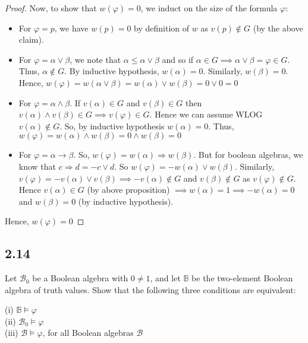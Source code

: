 \documentclass[12pt]{article}
\begin{document}
\begin{proof}
Now, to show that $w(\varphi) = 0$, we induct on the size of the formula $\varphi$:
\begin{itemize}
    \item For $\varphi = p$, we have $w(p) = 0$ by definition of $w$ as $v(p) \not \in G$ (by the above claim).
    \item For $\varphi = \alpha \vee \beta$, we note that $\alpha \leq \alpha \vee \beta$ and so if $\alpha \in G \implies \alpha \vee \beta = \varphi \in G$. Thus, $\alpha \not \in G$. By inductive hypothesis, $w(\alpha) = 0$. Similarly, $w(\beta) = 0$. Hence, $w(\varphi) = w(\alpha \vee \beta) = w(\alpha) \vee w(\beta) = 0 \vee 0 = 0$
    \item For $\varphi = \alpha \wedge \beta$. If $v(\alpha) \in G$ and $v(\beta) \in G$ then $v(\alpha) \wedge v(\beta) \in G \implies v(\varphi) \in G$. Hence we can assume WLOG $v(\alpha) \not \in G$. So, by inductive hypothesis $w(\alpha) = 0$. Thus, $w(\varphi) = w(\alpha) \wedge w(\beta) = 0 \wedge w(\beta) = 0$
    \item For $\varphi = \alpha \rightarrow \beta$. So, $w(\varphi) = w(\alpha) \Rightarrow w(\beta)$. But for boolean algebras, we know that $c \Rightarrow d = -c \vee d$. So $w(\varphi) = -w(\alpha) \vee w(\beta)$. Similarly, $v(\varphi) = -v(\alpha) \vee v(\beta) \implies -v(\alpha) \not \in G$ and $v(\beta) \not \in G$ as $v(\varphi) \not \in G$.
    Hence $v(\alpha) \in G$ (by above proposition) $\implies w(\alpha) = 1 \implies -w(\alpha) = 0$ and $w(\beta) = 0$ (by inductive hypothesis).
\end{itemize}
Hence, $w(\varphi) = 0$
\end{proof}

\subsection*{2.14}
Let $\mathcal{B}_0$ be a Boolean algebra with $0 \neq 1$, and let $\mathbb{B}$ be the two-element Boolean algebra of truth values. Show that the following three conditions are equivalent:

(i) $\mathbb{B} \vDash \varphi$ \\
(ii) $\mathcal{B}_0 \vDash \varphi$ \\
(iii) $\mathcal{B} \vDash \varphi$, for all Boolean algebras $\mathcal{B}$ \\
\end{document}
